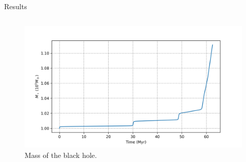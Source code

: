 \documentclass{beamer}
\begin{document}
\begin{frame}{Results}
\begin{columns}
\begin{column}{0.7\linewidth}
\begin{figure}[h]
				\includegraphics[width = \linewidth]{"../Files/Week 6/properties_s02v70_2"}
				\caption{Mass of the black hole.}
			\end{figure}
		\end{column}
	\end{columns}
\end{frame}
\end{document}
